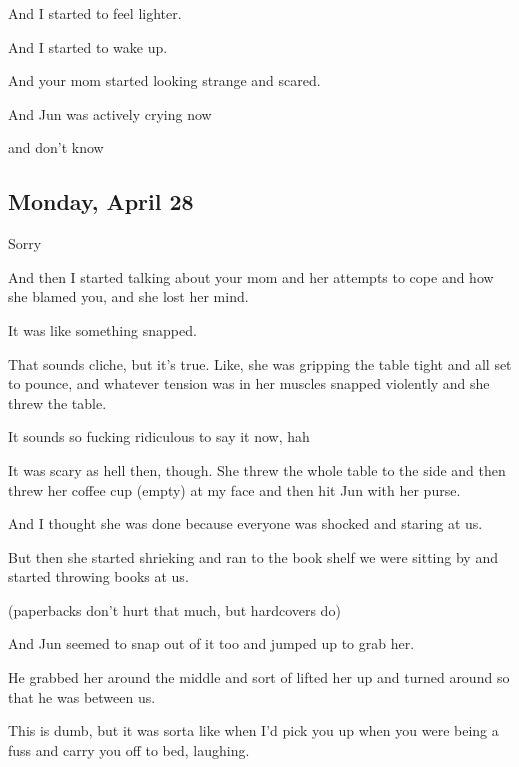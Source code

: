 {
And I started to feel lighter.

And I started to wake up.

And your mom started looking strange
and scared.

And Jun was actively crying now

and don't know

\newpage

\subsection*{Monday, April 28}\label{monday-april-28}

Sorry

And then I started talking about
your mom and her attempts to cope and how she blamed you, and she lost
her mind.

It was like something snapped.

That sounds cliche, but it's true.
Like, she was gripping the table tight and all set to pounce, and
whatever tension was in her muscles snapped violently and she threw the
table.

It sounds so fucking ridiculous to
say it now, hah

It was scary as hell then, though.
She threw the whole table to the side and then threw her coffee cup
(empty) at my face and then hit Jun with her purse.

And I thought she was done because
everyone was shocked and staring at us.

But then she started shrieking and
ran to the book shelf we were sitting by and started throwing books at
us.

(paperbacks don't hurt that much,
but hardcovers do)

And Jun seemed to snap out of it
too and jumped up to grab her.

He grabbed her around the middle
and sort of lifted her up and turned around so that he was between us.

This is dumb, but it was sorta like
when I'd pick you up when you were being a fuss and carry you off to
bed, laughing.

}

